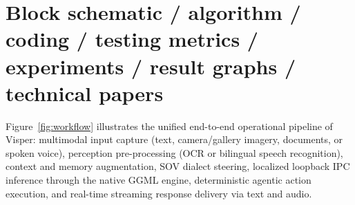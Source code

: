 \documentclass[11pt]{article}
\begin{document}
\section{Block schematic / algorithm / coding / testing metrics / experiments / result graphs / technical papers}

Figure~\ref{fig:workflow} illustrates the unified end-to-end operational pipeline of Visper:
multimodal input capture (text, camera/gallery imagery, documents, or spoken voice), perception
pre-processing (OCR or bilingual speech recognition), context and memory augmentation, SOV
dialect steering, localized loopback IPC inference through the native GGML engine, deterministic
agentic action execution, and real-time streaming response delivery via text and audio.
\end{document}

